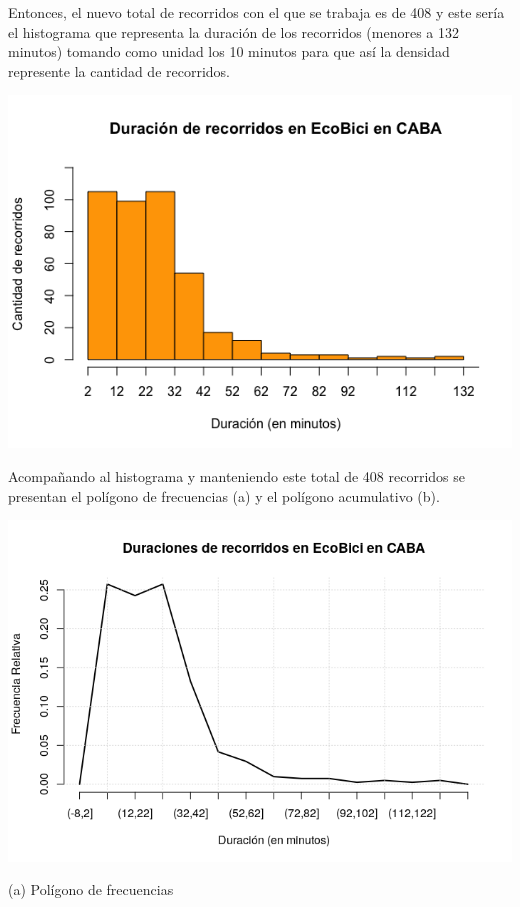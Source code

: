 \documentclass[11pt]{article}
\begin{document}
    Entonces, el nuevo total de recorridos con el que se trabaja es de 408 y este ser\'ia el histograma que representa la duraci\'on de los recorridos (menores a 132 minutos) tomando como unidad los 10 minutos para que as\'i la densidad represente la cantidad de recorridos.

    \begin{center}
      \includegraphics[scale=0.55]{NewHistDuracion.png}
    \end{center}

    \vspace{-2mm}
    Acompañando al histograma y manteniendo este total de 408 recorridos se presentan el pol\'igono de frecuencias (a) y el pol\'igono acumulativo (b). 

    \begin{center}
      \includegraphics[scale=0.55]{PoligFrecDuracion.png}
      \vspace{-4mm}
  
      (a) Pol\'igono de frecuencias
    \end{center}
  
\end{document}
